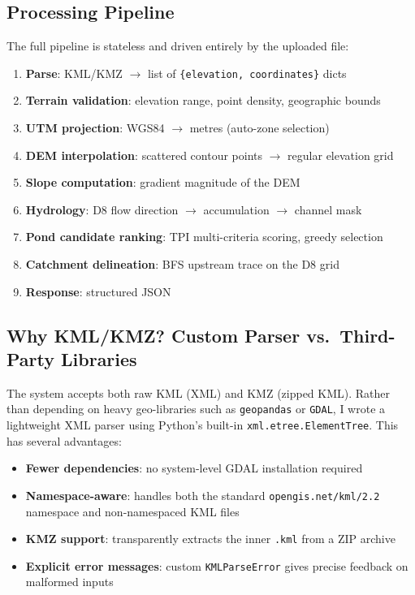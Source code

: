 \documentclass[12pt,a4paper]{article}
\begin{document}
\subsection{Processing Pipeline}

The full pipeline is stateless and driven entirely by the uploaded file:

\begin{enumerate}
\item \textbf{Parse}: KML/KMZ $\rightarrow$ list of \texttt{\{elevation, coordinates\}} dicts
\item \textbf{Terrain validation}: elevation range, point density, geographic bounds
\item \textbf{UTM projection}: WGS84 $\rightarrow$ metres (auto-zone selection)
\item \textbf{DEM interpolation}: scattered contour points $\rightarrow$ regular elevation grid
\item \textbf{Slope computation}: gradient magnitude of the DEM
\item \textbf{Hydrology}: D8 flow direction $\rightarrow$ accumulation $\rightarrow$ channel mask
\item \textbf{Pond candidate ranking}: TPI multi-criteria scoring, greedy selection
\item \textbf{Catchment delineation}: BFS upstream trace on the D8 grid
\item \textbf{Response}: structured JSON
\end{enumerate}

\subsection{Why KML/KMZ? Custom Parser vs.\ Third-Party Libraries}

The system accepts both raw KML (XML) and KMZ (zipped KML). Rather than depending on heavy geo-libraries such as \texttt{geopandas} or \texttt{GDAL}, I wrote a lightweight XML parser using Python's built-in \texttt{xml.etree.ElementTree}. This has several advantages:

\begin{itemize}
\item \textbf{Fewer dependencies}: no system-level GDAL installation required
\item \textbf{Namespace-aware}: handles both the standard \texttt{opengis.net/kml/2.2} namespace and non-namespaced KML files
\item \textbf{KMZ support}: transparently extracts the inner \texttt{.kml} from a ZIP archive
\item \textbf{Explicit error messages}: custom \texttt{KMLParseError} gives precise feedback on malformed inputs
\end{itemize}
\end{document}

